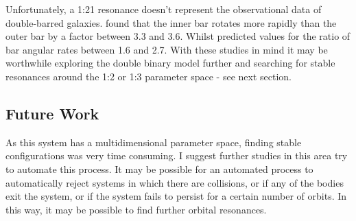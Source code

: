 \documentclass[a4paper,12pt]{article}
\begin{document}
Unfortunately, a 1:21 resonance doesn't represent the observational data of double-barred galaxies. \cite{font} found that the inner bar rotates more rapidly than the outer bar by a factor between 3.3 and 3.6.
Whilst \cite{macie4} predicted values for the ratio of bar angular rates between 1.6 and 2.7. With these studies in mind it may be worthwhile exploring the double binary model further and searching for stable
resonances around the 1:2 or 1:3 parameter space - see next section.

\subsection{Future Work}
As this system has a multidimensional parameter space, finding stable configurations was very time consuming. I suggest further studies in this area try to automate this process.
It may be possible for an automated process to automatically reject systems in which there are collisions, or if any of the bodies exit the system, or if the system fails 
to persist for a certain number of orbits. In this way, it may be possible to find further orbital resonances.
\end{document}
